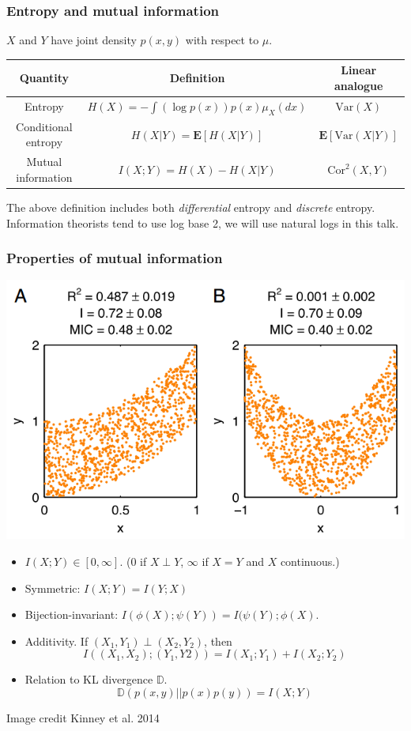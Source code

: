 \documentclass{beamer}
\newcommand{\E}{\textbf{E}}
\begin{document}
\begin{frame}
\frametitle{Entropy and mutual information}
$X$ and $Y$ have joint density $p(x, y)$ with respect to $\mu$.

\vspace{0.5in}

\begin{tabular}{c|c|c}
\hline
Quantity & Definition & Linear analogue\\\hline
Entropy & $H(X) = - \int (\log p(x)) p(x) \mu_X(dx)$ & $\text{Var}(X)$\\
Conditional entropy & $H(X|Y) = \E[H(X|Y)]$ & $\E[\text{Var}(X|Y)]$\\
Mutual information & $I(X;Y) = H(X) - H(X|Y)$ & $\text{Cor}^2(X, Y)$\\\hline
\end{tabular}

\vspace{0.3in}

\small{The above definition includes both \emph{differential} entropy and \emph{discrete} entropy.
Information theorists tend to use log base 2, we will use natural logs in this talk.}
\end{frame}

\begin{frame}
\frametitle{Properties of mutual information}
\begin{center}
\includegraphics[scale = 0.2]{kinney.png}
\end{center}
\begin{itemize}
\item $I(X;Y) \in [0,\infty]$.  (0 if $X \perp Y$, $\infty$ if $X=Y$ and $X$ continuous.)
\item Symmetric: $I(X;Y) = I(Y; X)$
\item Bijection-invariant: $I(\phi(X); \psi(Y)) = I(\psi(Y);\phi(X)$.
\item Additivity.  If $(X_1,Y_1) \perp (X_2, Y_2)$, then
\[
I((X_1, X_2); (Y_1, Y2)) = I(X_1; Y_1) + I(X_2; Y_2)
\]
\item Relation to KL divergence $\mathbb{D}$.
\[
\mathbb{D}(p(x, y)||p(x)p(y)) = I(X; Y)
\]
\end{itemize}
\tiny{Image credit Kinney et al. 2014}
\end{frame}
\end{document}
